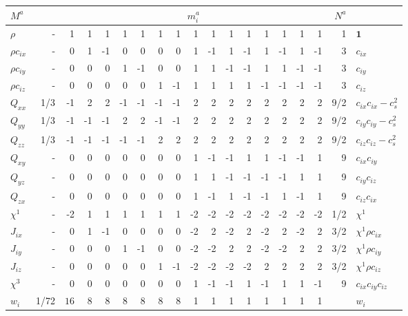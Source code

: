 \begin{table}
\begin{tabular}{|l|r|r|rrrrrr|rrrrrrrr|r|l|}
\hline\hline
$M^a$ & & \multicolumn{15}{c|}{$m_i^a$} & $N^a$  &\\
\hline
$\rho$ & - &
 1 &  1 &  1 &  1 &  1 &  1 &  1 &  1 &  1 &  1 &  1 &  1 &  1 &  1 &  1 &
1 &$\mathbf{1}$ \\
\hline
$\rho c_{ix}$ & - &
 0 &  1 & -1 &  0 &  0 &  0 &  0 &  1 & -1 &  1 & -1 &  1 & -1 &  1 & -1 &
3  & $c_{ix}$ \\
\hline
$\rho c_{iy}$ & - &
 0 &  0 &  0 &  1 & -1 &  0 &  0 &  1 &  1 & -1 & -1 &  1 &  1 & -1 & -1 &
3  &$c_{iy}$ \\
\hline
$\rho c_{iz}$ & - &
 0 &  0 &  0 &  0 &  0 &  1 & -1 &  1 &  1 &  1 &  1 & -1 & -1 & -1 & -1 &
3  & $c_{iz}$ \\
\hline
$Q_{xx}$ & 1/3 &
-1 &  2 &  2 & -1 & -1 & -1 & -1 &  2 &  2 &  2 &  2 &  2 &  2 &  2 &  2 &
9/2  & $c_{ix} c_{ix} - c_s^2$ \\
\hline
$Q_{yy}$ & 1/3 &
-1 & -1 & -1 &  2 &  2 & -1 & -1 &  2 &  2 &  2 &  2 &  2 &  2 &  2 &  2 &
 9/2 & $c_{iy} c_{iy} - c_s^2$ \\
\hline
$Q_{zz}$ & 1/3 &
-1 & -1 & -1 & -1 & -1 &  2 &  2 &  2 &  2 &  2 &  2 &  2 &  2 &  2 &  2 &
 9/2 & $c_{iz} c_{iz} - c_s^2$ \\
\hline
$Q_{xy}$ & - &
 0 &  0 &  0 &  0 &  0 &  0 &  0 &  1 & -1 & -1 &  1 &  1 & -1 & -1 &  1 &
9  & $c_{ix} c_{iy}$ \\
\hline
$Q_{yz}$ & - &
 0 &  0 &  0 &  0 &  0 &  0 &  0 &  1 &  1 & -1 & -1 & -1 & -1 &  1 &  1 &
9  & $c_{iy} c_{iz}$ \\
\hline
$Q_{zx}$ & - &
 0 &  0 &  0 &  0 &  0 &  0 &  0 &  1 & -1 &  1 & -1 & -1 &  1 & -1 &  1 &
9  & $c_{iz} c_{ix}$ \\
\hline\hline
$\chi^1$ & - &
-2 &  1 &  1 &  1 &  1 &  1 &  1 & -2 & -2 & -2 & -2 & -2 & -2 & -2 & -2 &
1/2 & $\chi^1$ \\
\hline
$J_{ix}$ & - &
 0 &  1 & -1 &  0 &  0 &  0 &  0 & -2 &  2 & -2 &  2 & -2 &  2 & -2 &  2 &
3/2 & $\chi^1 \rho c_{ix}$\\
\hline
$J_{iy}$ & - &
 0 &   0 &  0 &  1 & -1 &  0 &  0 & -2 & -2 &  2 &  2 & -2 & -2 &  2 &  2 &
3/2 & $\chi^1 \rho c_{iy}$\\
\hline
$J_{iz}$ & - &
 0 &   0 &  0 &  0 &  0 &  1 & -1 & -2 & -2 & -2 & -2 &  2 &  2 &  2 &  2 &
3/2 & $\chi^1 \rho c_{iz}$\\
\hline
$\chi^3$ & - &
 0 &   0 &  0 &  0 &  0 &  0 &  0 &  1 & -1 & -1 &  1 & -1 &  1 &  1 & -1 &
9 & $c_{ix} c_{iy} c_{iz}$ \\
\hline\hline
$w_i$ & 1/72 &
$16$ & 8 & 8 & 8 & 8 & 8 & 8 & 1 & 1 & 1 & 1 & 1 & 1 & 1 & 1 &
 & $w_i$\\
\hline\hline
\end{tabular}
\end{table}



